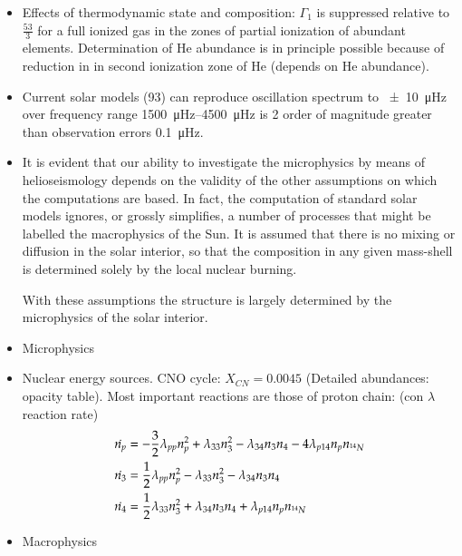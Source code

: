 \documentclass[../main.tex]{subfiles}
\begin{document}
{\begin{itemize}
\item Effects of thermodynamic state and composition: $\Gamma_1$ is suppressed relative to $\frac{53}{3}$ for a full ionized gas in the zones of partial ionization of abundant elements. Determination of He abundance is in principle possible because of reduction in \gexp{} in second ionization zone of He (depends on He abundance).
\item Current solar models (93) can reproduce oscillation spectrum to \SI{+-10}{\micro\hertz} over frequency range \SIrange{1500}{4500}{\micro\hertz} is 2 order of magnitude greater than observation errors \SI{0.1}{\micro\hertz}.
\item It is evident that our ability to investigate the microphysics by means of helioseismology depends on the validity of the other assumptions on which the computations are based. In fact, the computation of standard solar models ignores, or grossly simplifies, a number of processes that might be labelled the macrophysics of the Sun.
It is assumed that there is no mixing or diffusion in the solar interior, so that the composition in any given mass-shell is determined solely by the local nuclear burning. 

With these assumptions the structure is largely determined by the microphysics of the solar interior.

\item Microphysics

\item Nuclear energy sources.
CNO cycle: $X_{CN}=0.0045$ (Detailed abundances: opacity table).
Most important reactions are those of proton chain: (con $\lambda$ reaction rate)
\begin{align*}
&\dot{n_p}=-\frac{3}{2}\lambda_{pp}n_p^2+\lambda_{33}n_3^2-\lambda_{34}n_3n_4-4\lambda_{p14}n_pn_{\indices{^{14}}N}\\
&\dot{n_3}=\frac{1}{2}\lambda_{pp}n_p^2-\lambda_{33}n_3^2-\lambda_{34}n_3n_4\\
&\dot{n_4}=\frac{1}{2}\lambda_{33}n_3^2+\lambda_{34}n_3n_4+\lambda_{p14}n_pn_{\indices{^{14}}N}
\end{align*}


\item Macrophysics



\end{itemize}}
\end{document}
